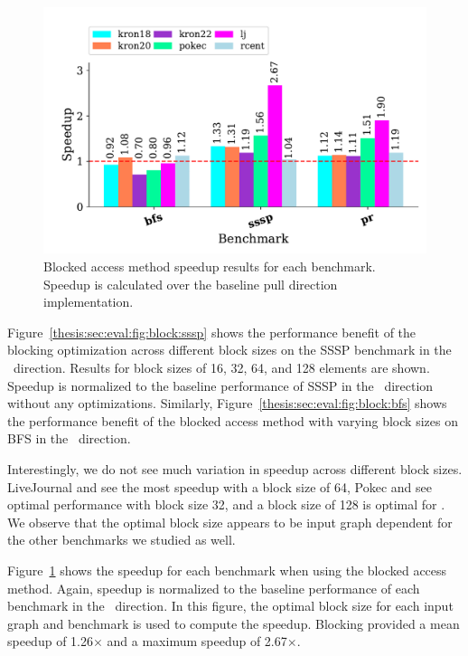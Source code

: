 \begin{figure}[!ht]
    \centering
    \includegraphics[scale = 0.6]{graphit-figures/all-blocked.pdf}
    \caption{Blocked access method speedup results for each benchmark. Speedup is calculated over the baseline pull direction implementation.} %
    \label{pap:generals:sec:eval:fig:blocked}
\end{figure}
 
Figure~\ref{thesis:sec:eval:fig:block:sssp} shows the performance benefit of the blocking optimization across different block sizes on the SSSP benchmark in the \pull~direction. 
Results for block sizes of 16, 32, 64, and 128 elements are shown.
Speedup is normalized to the baseline performance of SSSP in the \pull~direction without any optimizations.
Similarly, Figure~\ref{thesis:sec:eval:fig:block:bfs} shows the performance benefit of the blocked access method with varying block sizes on BFS in the \pull~direction.
 
Interestingly, we do not see much variation in speedup across different block sizes. 
LiveJournal and  see the most speedup with a block size of 64, Pokec and  see optimal performance with block size 32, and a block size of 128 is optimal for . 
We observe that the optimal block size appears to be input graph dependent for the other benchmarks we studied as well. 
 
Figure~\ref{pap:generals:sec:eval:fig:blocked} shows the speedup for each benchmark when using the blocked access method. 
Again, speedup is normalized to the baseline performance of each benchmark in the \pull~direction.
In this figure, the optimal block size for each input graph and benchmark is used to compute the speedup. 
Blocking provided a mean speedup of 1.26$\times$ and a maximum speedup of 2.67$\times$.
 
